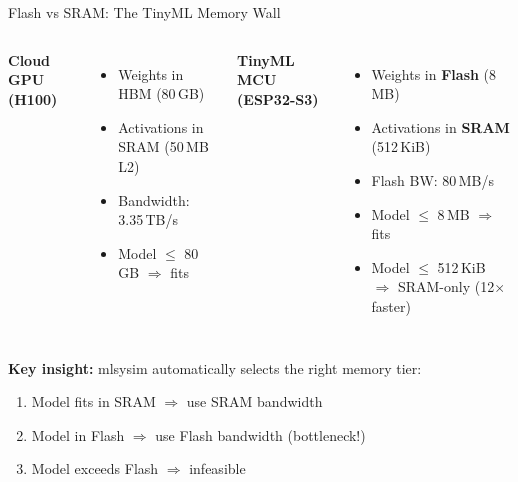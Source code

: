 \documentclass[aspectratio=169, 12pt]{beamer}
\begin{document}
\begin{frame}{Flash vs SRAM: The TinyML Memory Wall}
\begin{columns}[T]
\textbf{Cloud GPU (H100)}
\begin{itemize}
  \item Weights in HBM (80\,GB)
  \item Activations in SRAM (50\,MB L2)
  \item Bandwidth: 3.35\,TB/s
  \item Model $\leq$ 80\,GB $\Rightarrow$ fits
\end{itemize}

\textbf{TinyML MCU (ESP32-S3)}
\begin{itemize}
  \item Weights in \textbf{Flash} (8\,MB)
  \item Activations in \textbf{SRAM} (512\,KiB)
  \item Flash BW: 80\,MB/s
  \item Model $\leq$ 8\,MB $\Rightarrow$ fits
  \item Model $\leq$ 512\,KiB $\Rightarrow$ SRAM-only (12$\times$ faster)
\end{itemize}
\end{columns}

\vspace{1em}
\textbf{Key insight:} mlsysim automatically selects the right memory tier:
\begin{enumerate}
  \item Model fits in SRAM $\Rightarrow$ use SRAM bandwidth
  \item Model in Flash $\Rightarrow$ use Flash bandwidth (bottleneck!)
  \item Model exceeds Flash $\Rightarrow$ infeasible
\end{enumerate}
\end{frame}
\end{document}
